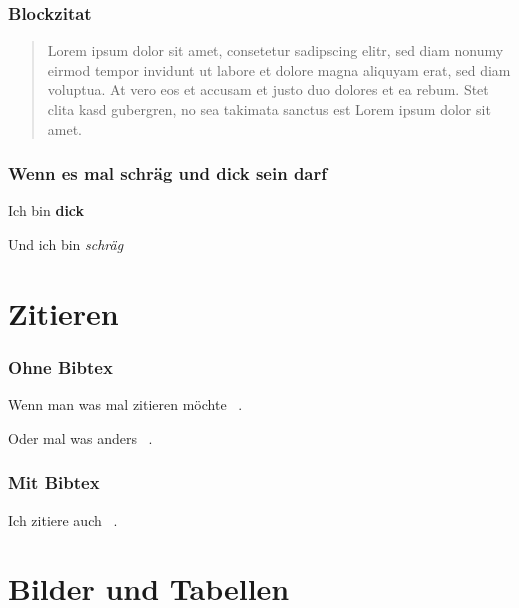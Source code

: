 \begin{frame}

\frametitle{Blockzitat}
\label{blockzitat}

\begin{quote}

Lorem ipsum dolor sit amet, consetetur sadipscing elitr, sed diam nonumy eirmod tempor invidunt ut labore et dolore magna aliquyam erat, sed diam voluptua. At vero eos et accusam et justo duo dolores et ea rebum. Stet clita kasd gubergren, no sea takimata sanctus est Lorem ipsum dolor sit amet.
\end{quote}

\end{frame}

\begin{frame}

\frametitle{Wenn es mal schräg und dick sein darf}
\label{wennesmalschrgunddickseindarf}

Ich bin \textbf{dick}

Und ich bin \emph{schräg}

\end{frame}

\section{Zitieren}
\label{zitieren}

\begin{frame}

\frametitle{Ohne Bibtex}
\label{ohnebibtex}

Wenn man was mal zitieren möchte ~\citep{Doe}.

Oder mal was anders ~\citep{Johnson}.

\end{frame}

\begin{frame}

\frametitle{Mit Bibtex}
\label{mitbibtex}

Ich zitiere auch ~\citep{Wickens}.

\end{frame}

\section{Bilder und Tabellen}
\label{bilderundtabellen}

